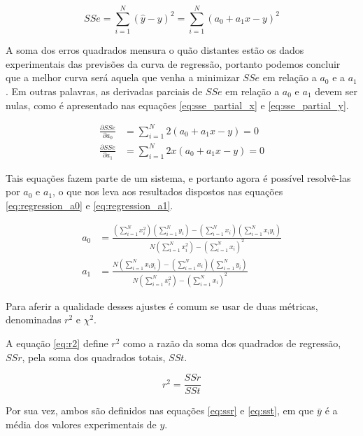 \documentclass{article}
\begin{document}
\begin{equation} \label{eq:sse}
    SSe = \sum_{i=1}^N (\hat y - y)^2 = \sum_{i=1}^N (a_0 + a_1x - y)^2
\end{equation}

A soma dos erros quadrados mensura o quão distantes estão os dados experimentais
das previsões da curva de regressão, portanto podemos concluir que a melhor
curva será aquela que venha a minimizar $SSe$ em relação a $a_0$ e a $a_1$. Em
outras palavras, as derivadas parciais de $SSe$ em relação a $a_0$ e $a_1$ devem
ser nulas, como é apresentado nas equações \eqref{eq:sse_partial_x} e
\eqref{eq:sse_partial_y}.

\begin{align}
    \label{eq:sse_partial_x}
    \frac{\partial SSe}{\partial a_0} &= \sum_{i=1}^N 2(a_0 + a_1x - y) = 0 \\
    \label{eq:sse_partial_y}
    \frac{\partial SSe}{\partial a_1} &= \sum_{i=1}^N 2x(a_0 + a_1x - y) = 0
\end{align} 

Tais equações fazem parte de um sistema, e portanto agora é possível resolvê-las
por $a_0$ e $a_1$, o que nos leva aos resultados dispostos nas equações
\eqref{eq:regression_a0} e \eqref{eq:regression_a1}.

\begin{align}
    \label{eq:regression_a0}
    a_0 &= \frac{\left(\sum_{i = 1}^N{x_i^2}\right)\left(\sum_{i =
    1}^N{y_i}\right) - \left(\sum_{i = 1}^N{x_i}\right)\left(\sum_{i = 1}^N{x_i
    y_i}\right)}{N\left(\sum_{i = 1}^N{x_i^2}\right) - \left(\sum_{i =
    1}^N{x_i}\right)^2} \\[1.5ex]
    \label{eq:regression_a1}
    a_1 &= \frac{N\left(\sum_{i = 1}^N{x_i y_i}\right) - \left(\sum_{i =
    1}^N{x_i}\right)\left(\sum_{i = 1}^N{y_i}\right)}{N\left(\sum_{i =
    1}^N{x_i^2}\right) - \left(\sum_{i = 1}^N{x_i}\right)^2}
\end{align}

Para aferir a qualidade desses ajustes é comum se usar de duas métricas,
denominadas $r^2$ e $\chi^2$.

A equação \eqref{eq:r2} define $r^2$ como a razão da soma dos quadrados de
regressão, $SSr$, pela soma dos quadrados totais, $SSt$.

\begin{equation}
    \label{eq:r2}
    r^2 = \frac{SSr}{SSt}
\end{equation}

Por sua vez, ambos são definidos nas equações \eqref{eq:ssr} e \eqref{eq:sst},
em que $\bar{y}$ é a média dos valores experimentais de $y$.
\end{document}
